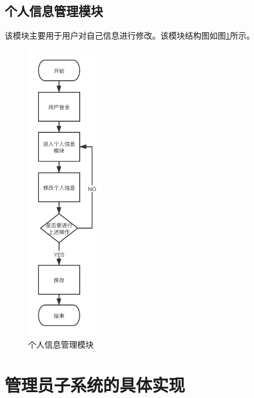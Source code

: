 \subsection{个人信息管理模块}
该模块主要用于用户对自己信息进行修改。该模块结构图如图\ref{figure:information}所示。
\begin{figure}[H]
\centering
\includegraphics[width=0.3\textwidth,keepaspectratio]{data/chapter-5/information.png}
\caption{个人信息管理模块}
\label{figure:information}
\end{figure}

\section{管理员子系统的具体实现}
